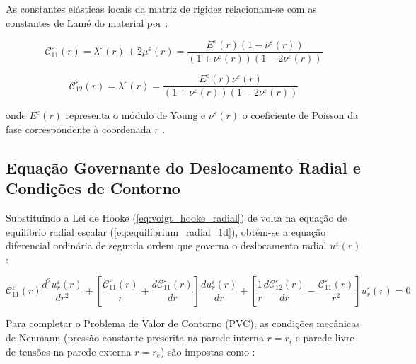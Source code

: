 
As constantes elásticas locais da matriz de rigidez relacionam-se com as constantes de Lamé do material por \cite{Timoshenko_1951}:

\begin{equation}
  \mathcal{C}_{11}^\varepsilon (r) = \lambda^\varepsilon (r) + 2 \mu^\varepsilon (r) = \frac{E^\varepsilon (r) (1 - \nu^\varepsilon (r))}{(1 + \nu^\varepsilon (r))(1 - 2 \nu^\varepsilon (r))}
  \label{eq:c11_lame}
\end{equation}

\begin{equation}
  \mathcal{C}_{12}^\varepsilon (r) = \lambda^\varepsilon (r) = \frac{E^\varepsilon (r) \nu^\varepsilon (r)}{(1 + \nu^\varepsilon (r))(1 - 2 \nu^\varepsilon (r))}
  \label{eq:c12_lame}
\end{equation}

onde $E^\varepsilon (r)$ representa o módulo de Young e $\nu^\varepsilon (r)$ o coeficiente de Poisson da fase correspondente à coordenada $r$ \cite{Sadd2009}.


\subsection{Equação Governante do Deslocamento Radial e Condições de Contorno} \label{subsec:equacao_governante}

Substituindo a Lei de Hooke (\eqref{eq:voigt_hooke_radial}) de volta na equação de equilíbrio radial escalar (\eqref{eq:equilibrium_radial_1d}), obtém-se a equação diferencial ordinária de segunda ordem que governa o deslocamento radial $u^\varepsilon (r)$ \cite{Timoshenko_1951}:

\begin{equation}
  \mathcal{C}_{11}^\varepsilon (r) \frac{d^2 u_r^\varepsilon(r)}{d r^2} + \left[ \frac{\mathcal{C}_{11}^\varepsilon (r)}{r} + \frac{d \mathcal{C}_{11}^\varepsilon (r)}{d r} \right] \frac{d u_r^\varepsilon(r)}{d r} + \left[ \frac{1}{r} \frac{d \mathcal{C}_{12}^\varepsilon (r)}{d r} - \frac{\mathcal{C}_{11}^\varepsilon (r)}{r^2} \right] u_r^\varepsilon(r) = 0
  \label{eq:ode_governing_radial}
\end{equation}

Para completar o Problema de Valor de Contorno (PVC), as condições mecânicas de Neumann (pressão constante prescrita na parede interna $r = r_i$ e parede livre de tensões na parede externa $r = r_e$) são impostas como \cite{Sadd2009}:

